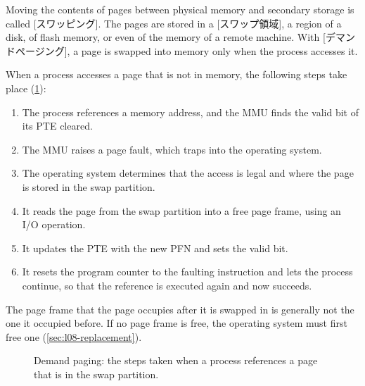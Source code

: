 \documentclass[../main.tex]{subfiles}
\begin{document}
\begin{definition}
  Moving the contents of pages between physical memory and secondary
  storage is called [スワッピング].  The pages are stored in
  a [スワップ領域], a region of a disk, of flash
  memory, or even of the memory of a remote machine.  With
  [デマンドページング], a page is swapped into memory
  only when the process accesses it.
\end{definition}

When a process accesses a page that is not in memory, the following steps
take place (\cref{fig:l08-page-fault}):
\begin{enumerate}
  \item The process references a memory address, and the MMU finds the
    valid bit of its PTE cleared.
  \item The MMU raises a page fault, which traps into the operating system.
  \item The operating system determines that the access is legal and where
    the page is stored in the swap partition.
  \item It reads the page from the swap partition into a free page frame,
    using an I/O operation.
  \item It updates the PTE with the new PFN and sets the valid bit.
  \item It resets the program counter to the faulting instruction and lets
    the process continue, so that the reference is executed again and now
    succeeds.
\end{enumerate}
The page frame that the page occupies after it is swapped in is generally
not the one it occupied before.  If no page frame is free, the operating
system must first free one (\cref{sec:l08-replacement}).

\begin{figure}[htbp]
  \centering
  
  \caption{Demand paging: the steps taken when a process references a page
    that is in the swap partition.}
  \label{fig:l08-page-fault}
\end{figure}
\end{document}
